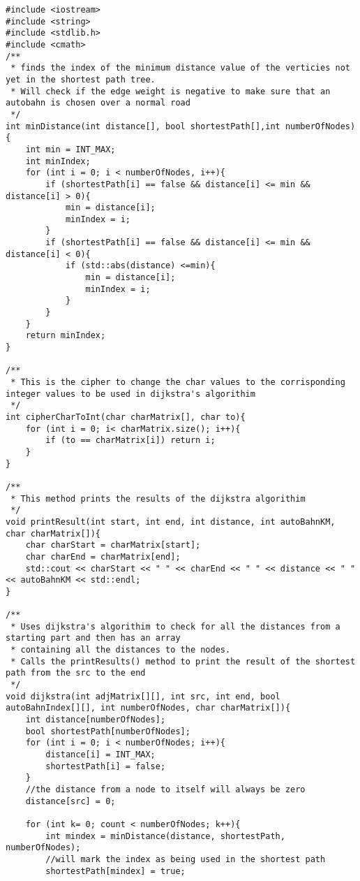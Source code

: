 \documentclass[11pt]{article}
\begin{document}
\begin {lstlisting}[frame=single]
#include <iostream>
#include <string>
#include <stdlib.h>
#include <cmath>
/**
 * finds the index of the minimum distance value of the verticies not yet in the shortest path tree. 
 * Will check if the edge weight is negative to make sure that an autobahn is chosen over a normal road
 */
int minDistance(int distance[], bool shortestPath[],int numberOfNodes){
    int min = INT_MAX;
    int minIndex;
    for (int i = 0; i < numberOfNodes, i++){
        if (shortestPath[i] == false && distance[i] <= min && distance[i] > 0){
            min = distance[i];
            minIndex = i; 
        }
        if (shortestPath[i] == false && distance[i] <= min && distance[i] < 0){
            if (std::abs(distance) <=min){
                min = distance[i];
                minIndex = i;
            }
        }
    }
    return minIndex;
}

/**
 * This is the cipher to change the char values to the corrisponding integer values to be used in dijkstra's algorithim 
 */
int cipherCharToInt(char charMatrix[], char to){
    for (int i = 0; i< charMatrix.size(); i++){
        if (to == charMatrix[i]) return i;
    }
}

/**
 * This method prints the results of the dijkstra algorithim 
 */
void printResult(int start, int end, int distance, int autoBahnKM, char charMatrix[]){
    char charStart = charMatrix[start];
    char charEnd = charMatrix[end];
    std::cout << charStart << " " << charEnd << " " << distance << " " << autoBahnKM << std::endl;
}

/**
 * Uses dijkstra's algorithim to check for all the distances from a starting part and then has an array 
 * containing all the distances to the nodes.
 * Calls the printResults() method to print the result of the shortest path from the src to the end
 */
void dijkstra(int adjMatrix[][], int src, int end, bool autoBahnIndex[][], int numberOfNodes, char charMatrix[]){
    int distance[numberOfNodes];
    bool shortestPath[numberOfNodes];       
    for (int i = 0; i < numberOfNodes; i++){
        distance[i] = INT_MAX;
        shortestPath[i] = false;
    }
    //the distance from a node to itself will always be zero
    distance[src] = 0;
    
    for (int k= 0; count < numberOfNodes; k++){
        int mindex = minDistance(distance, shortestPath, numberOfNodes);
        //will mark the index as being used in the shortest path
        shortestPath[mindex] = true;


\end{lstlisting}
\end{document}
